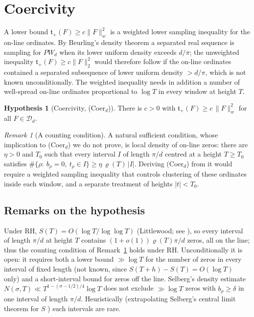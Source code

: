 \documentclass[11pt]{amsart}
\theoremstyle{definition}
\newtheorem{hypothesis}[theorem]{Hypothesis}
\theoremstyle{remark}
\newtheorem{remark}[theorem]{Remark}
\newcommand{\PW}{\mathit{PW}_d}
\newcommand{\tplus}{\mathfrak t_+}
\newcommand{\Norm}[1]{\lVert #1 \rVert}
\begin{document}
\section{Coercivity}\label{sec:H}

A lower bound $\tplus(F)\ge c\Norm{F}_w^{2}$ is a weighted lower sampling inequality for the
on-line ordinates. By Beurling's density theorem \cite{Beurling,Seip} a separated real
sequence is sampling for $\PW$ when its lower uniform density exceeds $d/\pi$; the
unweighted inequality $\tplus(F)\ge c\Norm{F}_2^{2}$ would therefore follow if the on-line
ordinates contained a separated subsequence of lower uniform density $>d/\pi$, which is not
known unconditionally. The weighted inequality needs in addition a number of well-spread
on-line ordinates proportional to $\log T$ in every window at height $T$.

\begin{hypothesis}[Coercivity, (Coer$_d$)]\label{def:H}
There is $c>0$ with $\tplus(F)\ge c\,\Norm{F}_w^{2}$ for all $F\in\mathcal D_d$.
\end{hypothesis}

\begin{remark}[A counting condition]\label{lem:E}
A natural sufficient condition, whose implication to (Coer$_d$) we do not prove, is local
density of on-line zeros: there are $\eta>0$ and $T_0$ such that every interval $I$ of
length $\pi/d$ centred at a height $T\ge T_0$ satisfies
$\#\{\rho:\ b_\rho=0,\ t_\rho\in I\}\ge\eta\,\varrho(T)\,|I|$. Deriving (Coer$_d$) from it
would require a weighted sampling inequality that controls clustering of these ordinates
inside each window, and a separate treatment of heights $|t|<T_0$.
\end{remark}

\subsection{Remarks on the hypothesis}\label{sec:Hstatus}
Under RH, $S(T)=O(\log T/\log\log T)$ (Littlewood; see \cite[Thm.~14.13]{Titchmarsh}), so
every interval of length $\pi/d$ at height $T$ contains $(1+o(1))\varrho(T)\pi/d$ zeros,
all on the line; thus the counting condition of Remark~\ref{lem:E} holds under RH.
Unconditionally it is open: it requires both a lower bound $\gg\log T$ for the number of
zeros in every interval of fixed length (not known, since $S(T+h)-S(T)=O(\log T)$ only) and
a short-interval bound for zeros off the line. Selberg's density estimate
$N(\sigma,T)\ll T^{1-(\sigma-1/2)/4}\log T$ \cite{Selberg1946} does not exclude
$\gg\log T$ zeros with $b_\rho\ge\delta$ in one interval of length $\pi/d$.
Heuristically (extrapolating Selberg's central limit theorem for $S$
\cite{Selberg,Selberg1946}) such intervals are rare.
\end{document}
